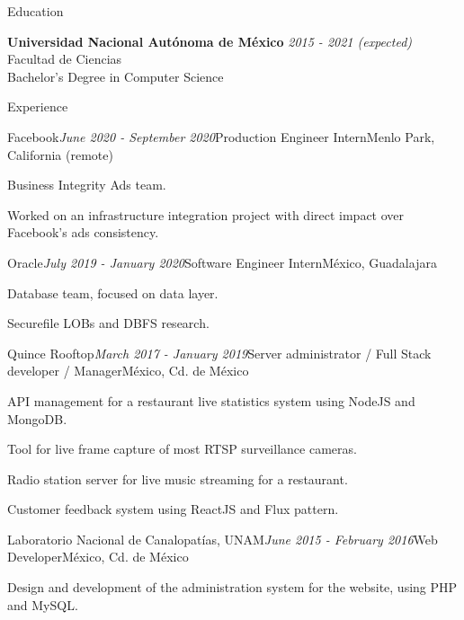 \documentclass{resume} %
\begin{document}

\begin{rSection}{Education}

{\bf Universidad Nacional Autónoma de México} \hfill {\em 2015 - 2021 (expected)}
\\ Facultad de Ciencias
\\ Bachelor's Degree in Computer Science

\end{rSection}


\begin{rSection}{Experience}

\begin{rSubsection}{Facebook}{\em June 2020 - September 2020}{Production Engineer Intern}{Menlo Park, California (remote)}
\item Business Integrity Ads team.
\item Worked on an infrastructure integration project with direct impact over Facebook's ads consistency.
\end{rSubsection}

\begin{rSubsection}{Oracle}{\em July 2019 - January 2020}{Software Engineer Intern}{México, Guadalajara}
\item Database team, focused on data layer.
\item Securefile LOBs and DBFS research.
\end{rSubsection}

\begin{rSubsection}{Quince Rooftop}{\em March 2017 - January 2019}{Server administrator / Full Stack developer / Manager}{México, Cd. de México}
\item API management for a restaurant live statistics system using NodeJS and MongoDB.
\item Tool for live frame capture of most RTSP surveillance cameras.
\item Radio station server for live music streaming for a restaurant.
\item Customer feedback system using ReactJS and Flux pattern.
\end{rSubsection}

\begin{rSubsection}{Laboratorio Nacional de Canalopatías, UNAM}{\em June 2015 - February 2016}{Web Developer}{México, Cd. de México}
\item Design and development of the administration system for the website, using PHP and MySQL.
\end{rSubsection}

\end{rSection}
\end{document}
